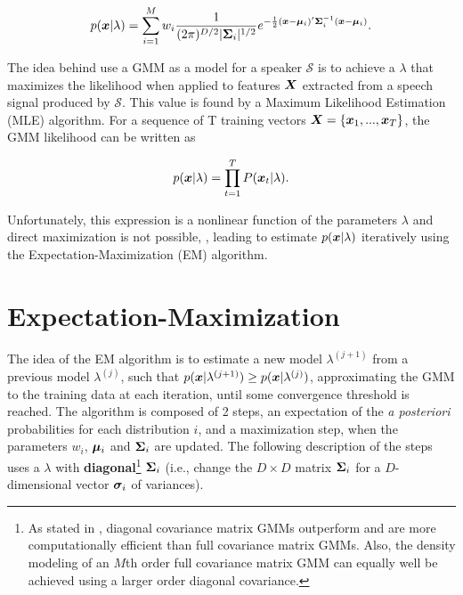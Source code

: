 \begin{equation}
    \postpdf{\dvec{x}}{\lambda} = \dgaussianmixture.
    \label{eq:likelihood_gmm}
\end{equation}

The idea behind use a GMM as a model for a speaker $\mathcal{S}$ is to achieve a $\lambda$ that maximizes the likelihood when applied to features $\boldsymbol{X}$ extracted from a speech signal produced by $\mathcal{S}$. This value is found by a Maximum Likelihood Estimation (MLE) algorithm. For a sequence of T training vectors $\boldsymbol{X} = \{\boldsymbol{x}_1, ..., \boldsymbol{x}_T\}$, the GMM likelihood can be written as

\begin{equation}
    \postpdf{\dvec{x}}{\lambda} = \prod_{t=1}^T \postprob{\dvec{x}_t}{\lambda}.
    \label{eq:likelihood_gmm_mle}
\end{equation}

\noindent Unfortunately, this expression is a nonlinear function of the parameters $\lambda$ and direct maximization is not possible, , leading to estimate $p(\boldsymbol{x}|\lambda)$ iteratively using the Expectation-Maximization (EM) algorithm.

\section{Expectation-Maximization}
\label{sec:em}

The idea of the EM algorithm is to estimate a new model $\lambda^{(j+1)}$ from a previous model $\lambda^{(j)}$, such that $p(\boldsymbol{x}|\lambda^{(j+1)}) \geq p(\boldsymbol{x}|\lambda^{(j)})$, approximating the GMM to the training data at each iteration, until some convergence threshold is reached. The algorithm is composed of 2 steps, an expectation of the \emph{a posteriori} probabilities for each distribution $i$, and a maximization step, when the parameters $w_i$, $\boldsymbol{\mu}_i$ and $\boldsymbol{\Sigma}_i$ are updated. The following description of the steps uses a $\lambda$ with \textbf{diagonal}\footnote{As stated in , diagonal covariance matrix GMMs outperform and are more computationally efficient than full covariance matrix GMMs. Also, the density modeling of an $M$th order full covariance matrix GMM can equally well be achieved using a larger order diagonal covariance.} $\boldsymbol{\Sigma}_i$ (i.e., change the $D \times D$ matrix $\boldsymbol{\Sigma}_i$ for a $D$-dimensional vector $\boldsymbol{\sigma}_i$ of variances).

